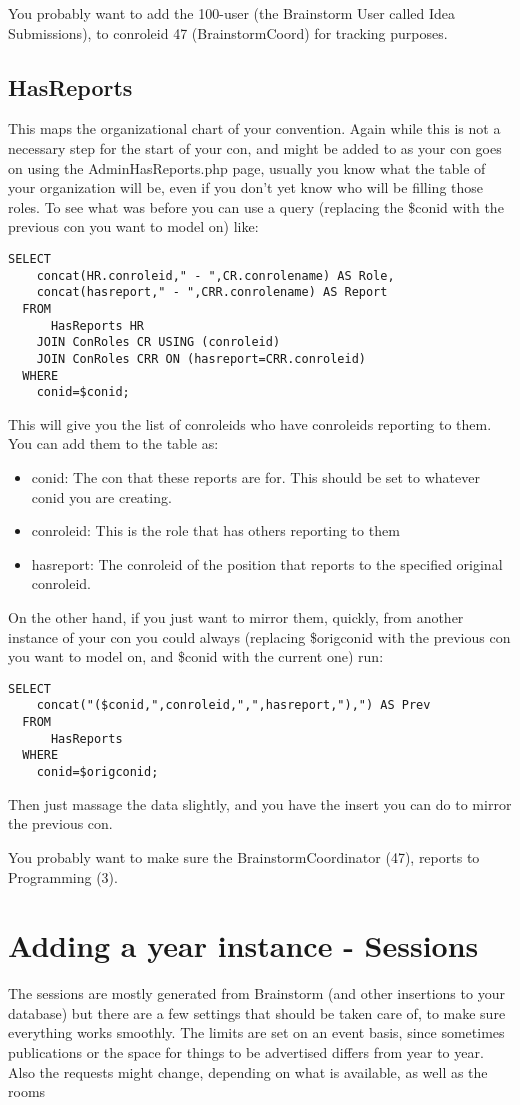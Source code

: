 \documentclass[captions=tablesignature]{scrartcl}
\begin{document}
You probably want to add the 100-user (the Brainstorm User called
Idea Submissions), to conroleid 47 (BrainstormCoord) for tracking
purposes.

\subsection{HasReports}
\label{sec-11-3}
This maps the organizational chart of your convention.  Again while
this is not a necessary step for the start of your con, and might
be added to as your con goes on using the AdminHasReports.php page,
usually you know what the table of your organization will be, even
if you don't yet know who will be filling those roles.  To see what
was before you can use a query (replacing the \$conid with the
previous con you want to model on) like:
\begin{verbatim}
SELECT
    concat(HR.conroleid," - ",CR.conrolename) AS Role,
    concat(hasreport," - ",CRR.conrolename) AS Report
  FROM
      HasReports HR
    JOIN ConRoles CR USING (conroleid)
    JOIN ConRoles CRR ON (hasreport=CRR.conroleid)
  WHERE
    conid=$conid;
\end{verbatim}
This will give you the list of conroleids who have conroleids
reporting to them.  You can add them to the table as:
\begin{itemize}
\item conid: The con that these reports are for.  This should be set
to whatever conid you are creating.
\item conroleid: This is the role that has others reporting to them
\item hasreport: The conroleid of the position that reports to the
specified original conroleid.
\end{itemize}

On the other hand, if you just want to mirror them, quickly, from
another instance of your con you could always (replacing \$origconid
with the previous con you want to model on, and \$conid with the
current one) run:
\begin{verbatim}
SELECT
    concat("($conid,",conroleid,",",hasreport,"),") AS Prev
  FROM
      HasReports
  WHERE
    conid=$origconid;
\end{verbatim}
Then just massage the data slightly, and you have the insert you
can do to mirror the previous con.

You probably want to make sure the BrainstormCoordinator (47),
reports to Programming (3).

\section{Adding a year instance - Sessions}
\label{sec-12}
The sessions are mostly generated from Brainstorm (and other
insertions to your database) but there are a few settings that
should be taken care of, to make sure everything works smoothly.
The limits are set on an event basis, since sometimes publications
or the space for things to be advertised differs from year to year.
Also the requests might change, depending on what is available,
as well as the rooms
\end{document}
